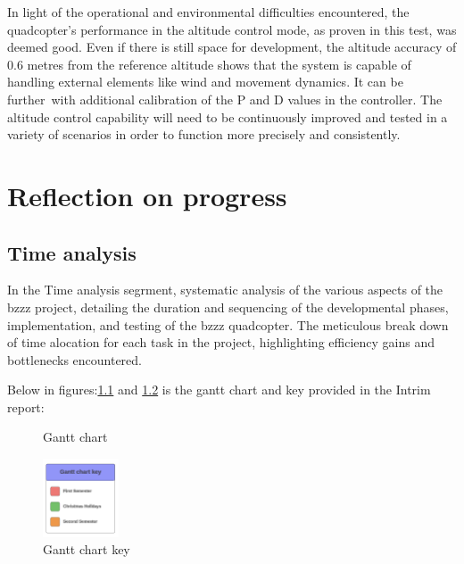 \documentclass{report}
\begin{document}
In light of the operational and environmental difficulties encountered, the
quadcopter's performance in the altitude control mode, as proven in this test,
was deemed good. Even if there is still space for development, the altitude
accuracy of 0.6 metres from the reference altitude shows that the system is
capable of handling external elements like wind and movement dynamics. It can be
further with additional calibration of the P and D values in the controller. The
altitude control capability will need to be continuously improved and tested in
a variety of scenarios in order to function more precisely and consistently.


\chapter{Reflection on progress}
\section{Time analysis}
In the Time analysis segrment, systematic analysis of the various aspects of the
bzzz project, detailing the duration and sequencing of the developmental phases,
implementation, and testing of the bzzz quadcopter. The meticulous break down of
time alocation for each task in the project, highlighting efficiency gains and
bottlenecks encountered.

Below in figures:\ref{fig:gantt_chart} and \ref{fig:gantt_chart_key} is the
gantt chart and key provided in the Intrim report:
\begin{figure}[H]
  \centering
  \caption{Gantt chart}
  \label{fig:gantt_chart}
\end{figure}
\begin{figure}[H]
  \centering
  \includegraphics[width=0.2\textwidth]{Pictures/Gantt_chart_key.png}
  \caption{Gantt chart key}
  \label{fig:gantt_chart_key}
\end{figure}
\end{document}
